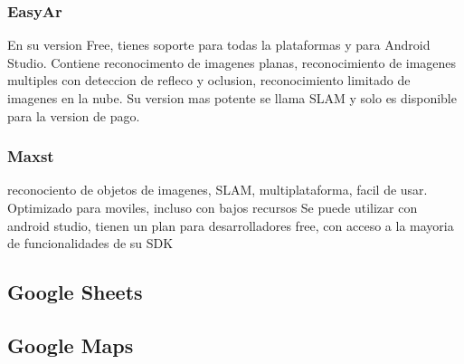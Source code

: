 \subsubsection{EasyAr}

En su version Free, tienes soporte para todas la plataformas y para Android Studio. Contiene reconocimento de imagenes planas, reconocimiento 
de imagenes multiples con deteccion de refleco y oclusion, reconocimiento limitado de imagenes en la nube.
    Su version mas potente se llama SLAM y solo es disponible para la version de pago.

  

\subsubsection{Maxst}

reconociento de objetos de imagenes, SLAM, multiplataforma, facil de usar. Optimizado para moviles, incluso con bajos recursos
Se puede utilizar con android studio, tienen un plan para desarrolladores free, con acceso a la mayoria de funcionalidades de su SDK


\subsection{Google Sheets}
\subsection{Google Maps}
